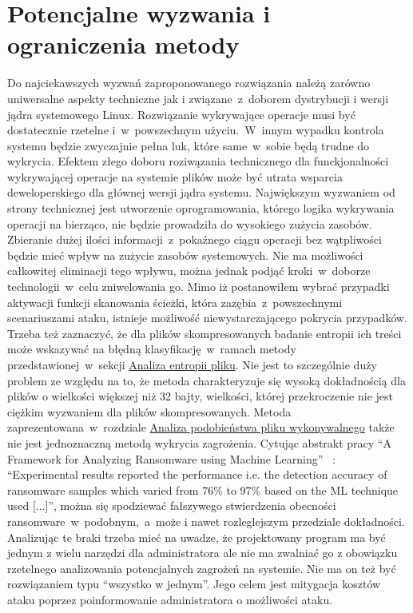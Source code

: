 \section{Potencjalne wyzwania i ograniczenia metody}
Do najciekawszych wyzwań zaproponowanego rozwiązania należą zarówno uniwersalne aspekty techniczne jak i związane~z~doborem dystrybucji i wersji jądra systemowego Linux. Rozwiązanie wykrywające operacje musi być dostatecznie rzetelne i~w~powszechnym użyciu.~W~innym wypadku kontrola systemu będzie zwyczajnie pełna luk, które same~w~sobie będą trudne do wykrycia. Efektem złego doboru roziwązania technicznego dla funckjonalności wykrywającej operacje na systemie plików może być utrata wsparcia deweloperskiego dla głównej wersji jądra systemu.
\newline
Największym wyzwaniem od strony technicznej jest utworzenie oprogramowania, którego logika wykrywania operacji na bierząco, nie będzie prowadziła do wysokiego zużycia zasobów. Zbieranie dużej ilości informacji~z~pokaźnego ciągu operacji bez wątpliwości będzie mieć wpływ na zużycie zasobów systemowych. Nie ma możliwości całkowitej eliminacji tego wpływu, można jednak podjąć kroki~w~doborze technologii~w~celu zniwelowania go. 
\newline
Mimo iż postanowiłem wybrać przypadki aktywacji funkcji skanowania ścieżki, która zazębia~z~powszechnymi scenariuszami ataku, istnieje możliwość niewystarczającego pokrycia przypadków. 
\newline
Trzeba też zaznaczyć, że dla plików skompresowanych badanie entropii ich treści może wskazywać na błędną klasyfikację~w~ramach metody przedstawionej~w~sekcji \hyperref[sec:entropia] {Analiza entropii pliku}. Nie jest to szczególnie duży problem ze względu na to, że metoda charakteryzuje się wysoką dokładnością dla plików o wielkości większej niż 32 bajty, wielkości, której przekroczenie nie jest ciężkim wyzwaniem dla plików skompresowanych. 
\newline
Metoda zaprezentowana~w~rozdziale \hyperref[sec:binaries] {Analiza podobieństwa pliku wykonywalnego} także nie jest jednoznaczną metodą wykrycia zagrożenia. Cytując abstrakt pracy \foreignquote{english}{A Framework for Analyzing Ransomware using
Machine Learning}~\cite{8628743} : \foreignquote{english}{Experimental results reported the performance
i.e. the detection accuracy of ransomware samples which varied
from 76\% to 97\% based on the ML technique used [...]}, można się spodziewać fałszywego stwierdzenia obecności ransomware~w~podobnym,~a~może i nawet rozleglejszym przedziale dokładności. 
\newline
Analizując te braki trzeba mieć na uwadze, że projektowany program ma być jednym z wielu narzędzi dla administratora ale nie ma zwalniać go z obowiązku rzetelnego analizowania potencjalnych zagrożeń na systemie. Nie ma on też być rozwiązaniem typu \enquote{wszystko w jednym}. Jego celem jest mitygacja kosztów ataku poprzez poinformowanie administratora o możliwości ataku.
